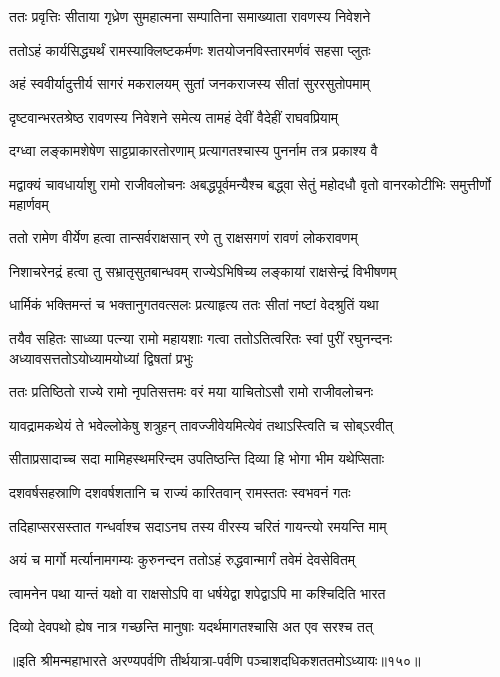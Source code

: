 \twolineshloka
{ततः प्रवृत्तिः सीताया गृध्रेण सुमहात्मना}
{सम्पातिना समाख्याता रावणस्य निवेशने}


\twolineshloka
{ततोऽहं कार्यसिद्ध्यर्थं रामस्याक्लिष्टकर्मणः}
{शतयोजनविस्तारमर्णवं सहसा प्लुतः}


\twolineshloka
{अहं स्ववीर्यादुत्तीर्य सागरं मकरालयम्}
{सुतां जनकराजस्य सीतां सुररसुतोपमाम्}


\twolineshloka
{दृष्टवान्भरतश्रेष्ठ रावणस्य निवेशने}
{समेत्य तामहं देवीं वैदेहीं राघवप्रियाम्}


\twolineshloka
{दग्ध्वा लङ्कामशेषेण साट्टप्राकारतोरणाम्}
{प्रत्यागतश्चास्य पुनर्नाम तत्र प्रकाश्य वै}


\threelineshloka
{मद्वाक्यं चावधार्याशु रामो राजीवलोचनः}
{अबद्धपूर्वमन्यैश्च बद्ध्वा सेतुं महोदधौ}
{वृतो वानरकोटीभिः समुत्तीर्णो महार्णवम्}


\twolineshloka
{ततो रामेण वीर्येण हत्वा तान्सर्वराक्षसान्}
{रणे तु राक्षसगणं रावणं लोकरावणम्}


\twolineshloka
{निशाचरेनद्रं हत्वा तु सभ्रातृसुतबान्धवम्}
{राज्येऽभिषिच्य लङ्कायां राक्षसेन्द्रं विभीषणम्}


\twolineshloka
{धार्मिकं भक्तिमन्तं च भक्तानुगतवत्सलः}
{प्रत्याहृत्य ततः सीतां नष्टां वेदश्रुतिं यथा}


\threelineshloka
{तयैव सहितः साध्व्या पत्न्या रामो महायशाः}
{गत्वा ततोऽतित्वरितः स्वां पुरीं रघुनन्दनः}
{अध्यावसत्ततोऽयोध्यामयोध्यां द्विषतां प्रभुः}


\twolineshloka
{ततः प्रतिष्ठितो राज्ये रामो नृपतिसत्तमः}
{वरं मया याचितोऽसौ रामो राजीवलोचनः}


\twolineshloka
{यावद्रामकथेयं ते भवेल्लोकेषु शत्रुहन्}
{तावज्जीवेयमित्येवं तथाऽस्त्विति च सोब्ऽरवीत्}


\twolineshloka
{सीताप्रसादाच्च सदा मामिहस्थमरिन्दम}
{उपतिष्ठन्ति दिव्या हि भोगा भीम यथेप्सिताः}


\twolineshloka
{दशवर्षसहस्राणि दशवर्षशतानि च}
{राज्यं कारितवान् रामस्ततः स्वभवनं गतः}


\twolineshloka
{तदिहाप्सरसस्तात गन्धर्वाश्च सदाऽनघ}
{तस्य वीरस्य चरितं गायन्त्यो रमयन्ति माम्}


\twolineshloka
{अयं च मार्गो मर्त्यानामगम्यः कुरुनन्दन}
{ततोऽहं रुद्धवान्मार्गं तवेमं देवसेवितम्}


\twolineshloka
{त्वामनेन पथा यान्तं यक्षो वा राक्षसोऽपि वा}
{धर्षयेद्वा शपेद्वाऽपि मा कश्चिदिति भारत}


\twolineshloka
{दिव्यो देवपथो ह्येष नात्र गच्छन्ति मानुषाः}
{यदर्थमागतश्चासि अत एव सरश्च तत्}

॥इति श्रीमन्महाभारते अरण्यपर्वणि तीर्थयात्रा-पर्वणि पञ्चाशदधिकशततमोऽध्यायः॥१५०॥

\closesection